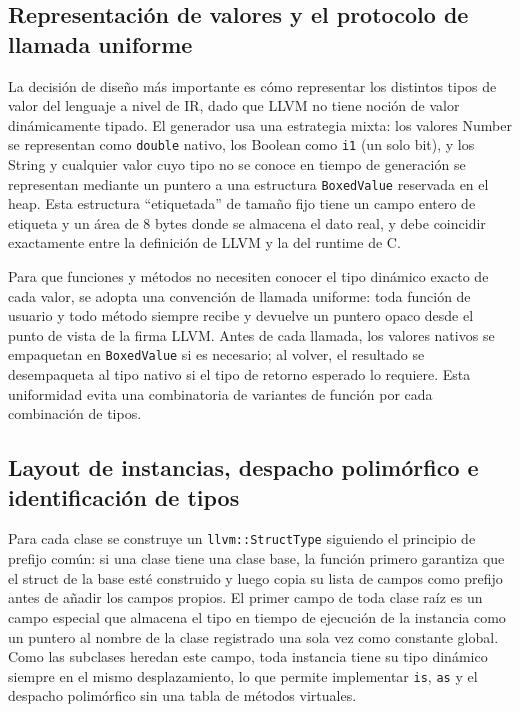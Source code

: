 \documentclass[11pt,a4paper]{article}
\begin{document}
\subsection{Representación de valores y el protocolo de llamada uniforme}

La decisión de diseño más importante es cómo representar los distintos tipos de valor del lenguaje a nivel de IR, dado que LLVM no tiene noción de valor dinámicamente tipado. El generador usa una estrategia mixta: los valores Number se representan como \texttt{double} nativo, los Boolean como \texttt{i1} (un solo bit), y los String y cualquier valor cuyo tipo no se conoce en tiempo de generación se representan mediante un puntero a una estructura \texttt{BoxedValue} reservada en el heap. Esta estructura ``etiquetada'' de tamaño fijo tiene un campo entero de etiqueta y un área de 8 bytes donde se almacena el dato real, y debe coincidir exactamente entre la definición de LLVM y la del runtime de C.

Para que funciones y métodos no necesiten conocer el tipo dinámico exacto de cada valor, se adopta una convención de llamada uniforme: toda función de usuario y todo método siempre recibe y devuelve un puntero opaco desde el punto de vista de la firma LLVM. Antes de cada llamada, los valores nativos se empaquetan en \texttt{BoxedValue} si es necesario; al volver, el resultado se desempaqueta al tipo nativo si el tipo de retorno esperado lo requiere. Esta uniformidad evita una combinatoria de variantes de función por cada combinación de tipos.

\subsection{Layout de instancias, despacho polimórfico e identificación de tipos}

Para cada clase se construye un \texttt{llvm::StructType} siguiendo el principio de prefijo común: si una clase tiene una clase base, la función primero garantiza que el struct de la base esté construido y luego copia su lista de campos como prefijo antes de añadir los campos propios. El primer campo de toda clase raíz es un campo especial que almacena el tipo en tiempo de ejecución de la instancia como un puntero al nombre de la clase registrado una sola vez como constante global. Como las subclases heredan este campo, toda instancia tiene su tipo dinámico siempre en el mismo desplazamiento, lo que permite implementar \texttt{is}, \texttt{as} y el despacho polimórfico sin una tabla de métodos virtuales.
\end{document}
